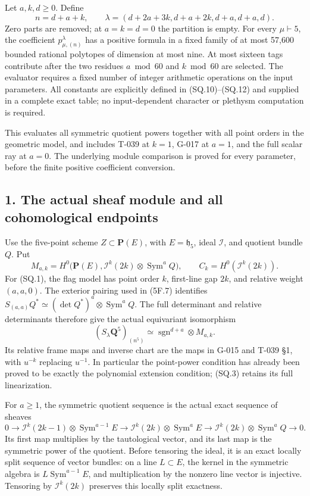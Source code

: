 \documentclass[
  10pt,
]{article}
\begin{document}
Let \(a,k,d\ge0\). Define \[
n=d+a+k,\qquad
\lambda=(d+2a+3k,d+a+2k,d+a,d+a,d).
\tag{SQ.1}
\] Zero parts are removed; at \(a=k=d=0\) the partition is empty. For
every \(\mu\vdash5\), the coefficient \(p_{\mu,(n)}^\lambda\) has a
positive formula in a fixed family of at most 57,600 bounded rational
polytopes of dimension at most nine. At most sixteen tags contribute
after the two residues \(a\bmod60\) and \(k\bmod60\) are selected. The
evaluator requires a fixed number of integer arithmetic operations on
the input parameters. All constants are explicitly defined in
(SQ.10)--(SQ.12) and supplied in a complete exact table; no
input-dependent character or plethysm computation is required.

This evaluates all symmetric quotient powers together with all point
orders in the geometric model, and includes T-039 at \(k=1\), G-017 at
\(a=1\), and the full scalar ray at \(a=0\). The underlying module
comparison is proved for every parameter, before the finite positive
coefficient conversion.

\subsection{1. The actual sheaf module and all cohomological
endpoints}\label{the-actual-sheaf-module-and-all-cohomological-endpoints}

Use the five-point scheme \(Z\subset\mathbf P(E)\), with
\(E=\mathfrak h_5\), ideal \(\mathcal I\), and quotient bundle \(Q\).
Put \[
M_{a,k}=H^0\bigl(\mathbf P(E),\mathcal I^k(2k)
                                      \otimes\operatorname{Sym}^aQ\bigr),
\qquad C_k=H^0(\mathcal I^k(2k)).
\tag{SQ.2}
\] For (SQ.1), the flag model has point order \(k\), first-line gap
\(2k\), and relative weight \((a,a,0)\). The exterior pairing used in
(5F.7) identifies
\(S_{(a,a)}Q^*\simeq(\det Q^*)^a\otimes\operatorname{Sym}^aQ\). The full
determinant and relative determinants therefore give the actual
equivariant isomorphism \[
\boxed{(S_\lambda\mathbf Q^5)_{(n^5)}
\simeq\operatorname{sgn}^{d+a}\otimes M_{a,k}.}
\tag{SQ.3}
\] Its relative frame maps and inverse chart are the maps in G-015 and
T-039 §1, with \(u^{-k}\) replacing \(u^{-1}\). In particular the
point-power condition has already been proved to be exactly the
polynomial extension condition; (SQ.3) retains its full linearization.

For \(a\ge1\), the symmetric quotient sequence is the actual exact
sequence of sheaves \[
0\to\mathcal I^k(2k-1)\otimes\operatorname{Sym}^{a-1}E
\longrightarrow\mathcal I^k(2k)\otimes\operatorname{Sym}^aE
\longrightarrow\mathcal I^k(2k)\otimes\operatorname{Sym}^aQ\to0.
\tag{SQ.4}
\] Its first map multiplies by the tautological vector, and its last map
is the symmetric power of the quotient. Before tensoring the ideal, it
is an exact locally split sequence of vector bundles: on a line
\(L\subset E\), the kernel in the symmetric algebra is
\(L\operatorname{Sym}^{a-1}E\), and multiplication by the nonzero line
vector is injective. Tensoring by \(\mathcal I^k(2k)\) preserves this
locally split exactness.
\end{document}
